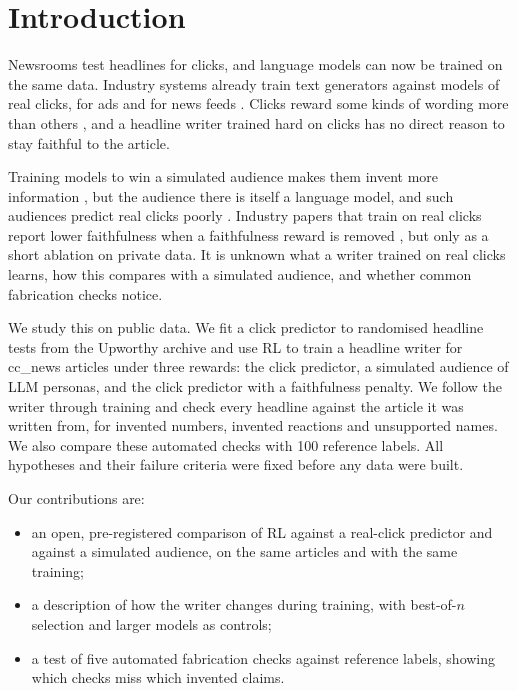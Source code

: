\section{Introduction}
Newsrooms test headlines for clicks, and language models can now be trained on the same data. Industry systems already train text generators against models of real clicks, for ads and for news feeds \citep{jiang2025rlpf,chen2026gese}. Clicks reward some kinds of wording more than others \citep{robertson2023negativity}, and a headline writer trained hard on clicks has no direct reason to stay faithful to the article.

Training models to win a simulated audience makes them invent more information \citep{elzou2025moloch}, but the audience there is itself a language model, and such audiences predict real clicks poorly \citep{maiorano2026personas}. Industry papers that train on real clicks report lower faithfulness when a faithfulness reward is removed \citep{chen2026gese}, but only as a short ablation on private data. It is unknown what a writer trained on real clicks learns, how this compares with a simulated audience, and whether common fabrication checks notice.

We study this on public data. We fit a click predictor to randomised headline tests from the Upworthy archive \citep{matias2021upworthy} and use RL to train a headline writer for cc\_news articles under three rewards: the click predictor, a simulated audience of LLM personas, and the click predictor with a faithfulness penalty. We follow the writer through training and check every headline against the article it was written from, for invented numbers, invented reactions and unsupported names. We also compare these automated checks with 100 reference labels. All hypotheses and their failure criteria were fixed before any data were built.

Our contributions are:
\begin{itemize}
\item an open, pre-registered comparison of RL against a real-click predictor and against a simulated audience, on the same articles and with the same training;
\item a description of how the writer changes during training, with best-of-$n$ selection and larger models as controls;
\item a test of five automated fabrication checks against reference labels, showing which checks miss which invented claims.
\end{itemize}
